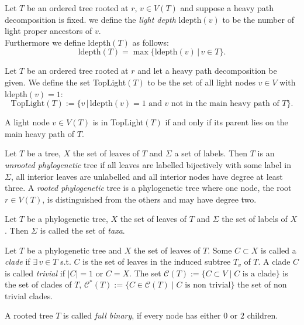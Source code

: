 \begin{defin}
Let $T$ be an ordered tree rooted at $r$, $v \in V(T)$ and suppose a heavy path decomposition is fixed. we define the \textit{light depth} ldepth$(v)$ to be the number of light proper ancestors of $v$.\\
Furthermore we define ldepth$(T)$ as follows:
$$\text{ldepth}(T) = \max \{\text{ldepth}(v) \,|\,v \in T\}.$$
\end{defin}
\begin{defin}
Let $T$ be an ordered tree rooted at $r$ and let a heavy path decomposition be given. We define the set TopLight$(T)$ to be the set of all light nodes $v \in V$ with ldepth$(v) = 1$:
$$\text{TopLight}(T) := \{v \,|\,\text{ldepth}(v)=1 \text{ and } v \text{ not in the main heavy path of }T\}.$$
\end{defin}
\begin{rem}
A light node $v\in V(T)$ is in TopLight$(T)$ if and only if its parent lies on the main heavy path of $T$.
\end{rem}
\begin{defin} Let $T$ be a tree, $X$ the set of leaves of $T$ and $\Sigma$ a set of labels. Then $T$ is an \textit{unrooted phylogenetic} tree if all leaves are labelled bijectively with some label in $\Sigma$, all interior leaves are unlabelled and all interior nodes have degree at least three. A \textit{rooted phylogenetic} tree is a phylogenetic tree where one node, the root $r \in V(T)$, is distinguished from the others and may have degree two.  
\end{defin}
\begin{defin} Let $T$ be a phylogenetic tree, $X$ the set of leaves of $T$ and $\Sigma$ the set of labels of $X$. Then $\Sigma$ is called the set of \textit{taxa}. 
\end{defin}
\begin{defin} Let $T$ be a phylogenetic tree and $X$ the set of leaves of $T$. Some $C \subset X$ is called a \textit{clade} if $\exists \,v \in T$ s.t. $C$ is the set of leaves in the induced subtree $T_v$ of $T$. A clade $C$ is called \textit{trivial} if $|C|=1$ or $C = X$. The set $\mathcal{C}(T) := \{C \subset V\;|\; C\text{ is a clade}\}$ is the set of clades of $T$, $\mathcal{C}^*(T) := \{C \in \mathcal{C}(T)\;|\; C\text{ is non trivial}\}$ the set of non trivial clades.
\end{defin}
\begin{defin} A rooted tree $T$ is called \textit{full binary}, if every node has either $0$ or $2$ children. 
\end{defin}
